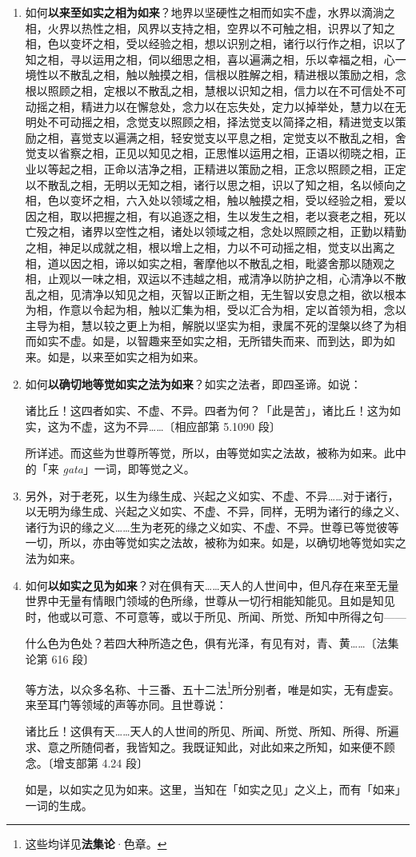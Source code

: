 \begin{enumerate}
\item 如何\textbf{以来至如实之相为如来}？地界以坚硬性之相而如实不虚，水界以滴淌之相，火界以热性之相，风界以支持之相，空界以不可触之相，识界以了知之相，色以变坏之相，受以经验之相，想以识别之相，诸行以行作之相，识以了知之相，寻以运用之相，伺以细思之相，喜以遍满之相，乐以幸福之相，心一境性以不散乱之相，触以触摸之相，信根以胜解之相，精进根以策励之相，念根以照顾之相，定根以不散乱之相，慧根以识知之相，信力以在不可信处不可动摇之相，精进力以在懈怠处，念力以在忘失处，定力以掉举处，慧力以在无明处不可动摇之相，念觉支以照顾之相，择法觉支以简择之相，精进觉支以策励之相，喜觉支以遍满之相，轻安觉支以平息之相，定觉支以不散乱之相，舍觉支以省察之相，正见以知见之相，正思惟以运用之相，正语以彻晓之相，正业以等起之相，正命以洁净之相，正精进以策励之相，正念以照顾之相，正定以不散乱之相，无明以无知之相，诸行以思之相，识以了知之相，名以倾向之相，色以变坏之相，六入处以领域之相，触以触摸之相，受以经验之相，爱以因之相，取以把握之相，有以追逐之相，生以发生之相，老以衰老之相，死以亡殁之相，诸界以空性之相，诸处以领域之相，念处以照顾之相，正勤以精勤之相，神足以成就之相，根以增上之相，力以不可动摇之相，觉支以出离之相，道以因之相，谛以如实之相，奢摩他以不散乱之相，毗婆舍那以随观之相，止观以一味之相，双运以不违越之相，戒清净以防护之相，心清净以不散乱之相，见清净以知见之相，灭智以正断之相，无生智以安息之相，欲以根本为相，作意以令起为相，触以汇集为相，受以汇合为相，定以首领为相，念以主导为相，慧以较之更上为相，解脱以坚实为相，隶属不死的涅槃以终了为相而如实不虚。如是，以智趣来至如实之相，无所错失而来、而到达，即为如来。如是，以来至如实之相为如来。
\item 如何\textbf{以确切地等觉如实之法为如来}？如实之法者，即四圣谛。如说：\begin{quoting}诸比丘！这四者如实、不虚、不异。四者为何？「此是苦」，诸比丘！这为如实，这为不虚，这为不异……{\bluefootnotesize 〔相应部第 5.1090 段〕}\end{quoting}所详述。而这些为世尊所等觉，所以，由等觉如实之法故，被称为如来。此中的「来 \textit{gata}」一词，即等觉之义。
\item 另外，对于老死，以生为缘生成、兴起之义如实、不虚、不异……对于诸行，以无明为缘生成、兴起之义如实、不虚、不异，同样，无明为诸行的缘之义、诸行为识的缘之义……生为老死的缘之义如实、不虚、不异。世尊已等觉彼等一切，所以，亦由等觉如实之法故，被称为如来。如是，以确切地等觉如实之法为如来。
\item 如何\textbf{以如实之见为如来}？对在俱有天……天人的人世间中，但凡存在来至无量世界中无量有情眼门领域的色所缘，世尊从一切行相能知能见。且如是知见时，他或以可意、不可意等，或以于所见、所闻、所觉、所知中所得之句——\begin{quoting}什么色为色处？若四大种所造之色，俱有光泽，有见有对，青、黄……{\bluefootnotesize 〔法集论第 616 段〕}\end{quoting}等方法，以众多名称、十三番、五十二法\footnote{这些均详见\textbf{法集论}·色章。}所分别者，唯是如实，无有虚妄。来至耳门等领域的声等亦同。且世尊说：\begin{quoting}诸比丘！这俱有天……天人的人世间的所见、所闻、所觉、所知、所得、所遍求、意之所随伺者，我皆知之。我既证知此，对此如来之所知，如来便不顾念。{\bluefootnotesize 〔增支部第 4.24 段〕}\end{quoting}如是，以如实之见为如来。这里，当知在「如实之见」之义上，而有「如来」一词的生成。

\end{enumerate}
